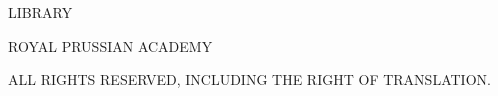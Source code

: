 \begin{center}
{\fontsize{14}{18}\selectfont LIBRARY}

{\fontsize{14}{18}\selectfont ROYAL PRUSSIAN ACADEMY}

\vspace{1cm}
{\fontsize{14}{18}\selectfont ALL RIGHTS RESERVED, INCLUDING THE RIGHT OF TRANSLATION.}
\end{center}
